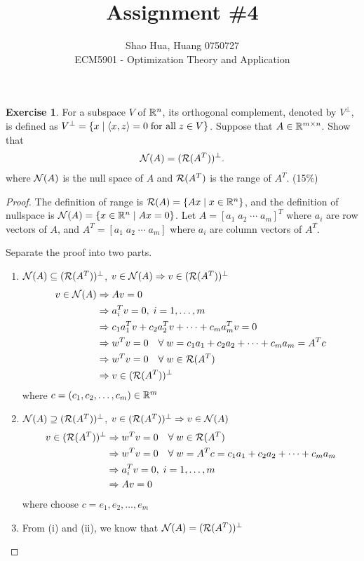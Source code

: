 \documentclass[12pt]{extarticle}
\title{Assignment \#4}
\author{Shao Hua, Huang 0750727\\
ECM5901 - Optimization Theory and Application}
\theoremstyle{definition}
\newtheorem{exercise}{Exercise}
\begin{document}
\maketitle

\begin{exercise}
  For a subspace $V$ of $\mathbb{R}^n$, its orthogonal complement, denoted by $V^\perp$, is defined as $V^\perp=\{x\mid \langle x,z\rangle=0\;\text{for all}\;z\in V\}$.
  Suppose that $A\in\mathbb{R}^{m\times n}$. Show that
  \begin{align*}
    {\mathcal N}(A) = ({\mathcal R}(A^T))^\perp.
  \end{align*}
  where ${\mathcal N}(A)$ is the null space of $A$ and ${\mathcal R}(A^T)$ is the range of $A^T$. (15\%)
\end{exercise}
\begin{proof}
  The definition of range is ${\mathcal R}(A)=\{Ax\mid x\in\mathbb{R}^n\}$, and the definition of nullspace is ${\mathcal N}(A)=\{x\in\mathbb{R}^n\mid Ax=0\}$.
  Let $A=[a_1\;a_2\;\cdots\;a_m]^T$ where $a_i$ are row vectors of $A$, and $A^T=[a_1\;a_2\;\cdots\;a_m]$ where $a_i$ are column vectors of $A^T$.\par
  Separate the proof into two parts.
  \begin{enumerate}[label=(\roman*)]
    \item ${\mathcal N}(A)\subseteq ({\mathcal R}(A^T))^\perp$, \ie $v\in{\mathcal N}(A)\Rightarrow v\in({\mathcal R}(A^T))^\perp$
          \begin{align*}
            v\in{\mathcal N}(A)&\Rightarrow Av=0\\
                             &\Rightarrow a_i^Tv=0,\;i=1,\dots,m\\
                             &\Rightarrow c_1a_1^Tv+c_2a_2^Tv+\cdots+c_ma_m^Tv=0\\
                             &\Rightarrow w^Tv=0\quad\forall\;w=c_1a_1+c_2a_2+\cdots+c_ma_m=A^Tc\\
                             &\Rightarrow w^Tv=0\quad\forall\;w\in{\mathcal R}(A^T)\\
                             &\Rightarrow v\in({\mathcal R}(A^T))^\perp
          \end{align*}
          where $c=(c_1,c_2,\dots,c_m)\in\mathbb{R}^m$
    \item ${\mathcal N}(A)\supseteq ({\mathcal R}(A^T))^\perp$, \ie $v\in({\mathcal R}(A^T))^\perp\Rightarrow v\in{\mathcal N}(A)$
          \begin{align*}
            v\in({\mathcal R}(A^T))^\perp&\Rightarrow w^Tv=0\quad\forall\;w\in{\mathcal R}(A^T)\\
                                   &\Rightarrow w^Tv=0\quad\forall\;w=A^Tc=c_1a_1+c_2a_2+\cdots+c_ma_m\\
                                   &\Rightarrow a_i^Tv=0,\;i=1,\dots,m\\
                                   &\Rightarrow Av=0
          \end{align*}
          where choose $c=e_1,e_2,\dots,e_m$
    \item From (i) and (ii), we know that ${\mathcal N}(A)=({\mathcal R}(A^T))^\perp$\qedhere
  \end{enumerate}
\end{proof}
\end{document}
